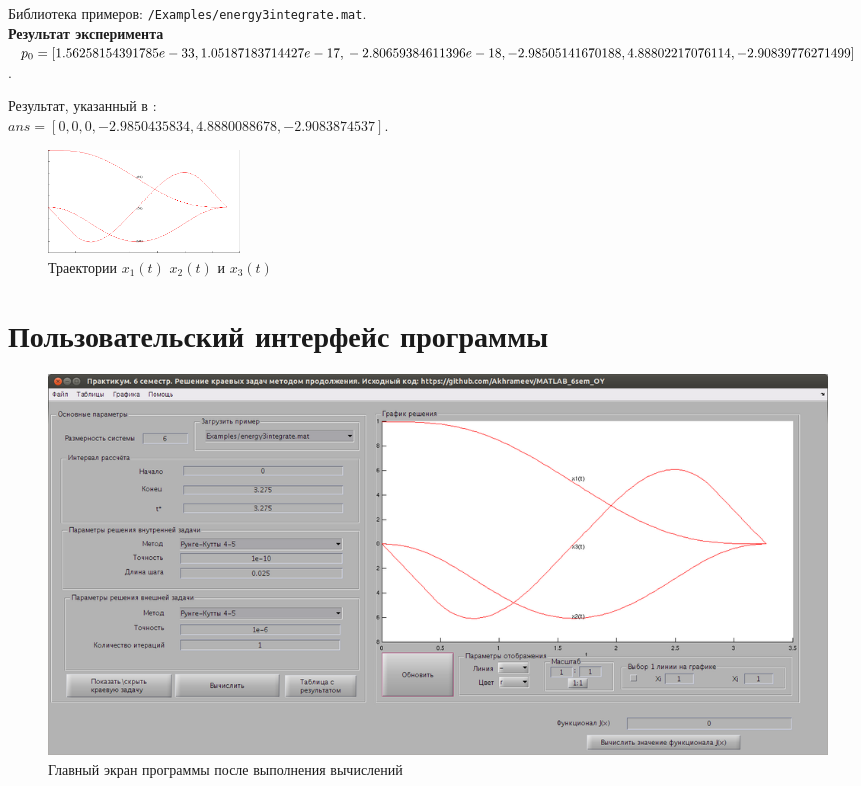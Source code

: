 Библиотека примеров: \texttt{/Examples/energy3integrate.mat}.
\newline\\
{\bf Результат эксперимента}
\newline\\
$p_0=[1.56258154391785e-33,    1.05187183714427e-17,\\	-2.80659384611396e-18,	-2.98505141670188,	4.88802217076114,	-2.90839776271499]$.

Результат, указанный в \cite{oy}:\\
$ans=[0, 0, 0, -2.9850435834, 4.8880088678, -2.9083874537]$.

\begin{figure}[t] 
\begin{center}
\includegraphics[width=2in]{Example3.png}
\end{center}
\caption{Траектории $x_1(t)$ $x_2(t)$ и $x_3(t)$}
\label{Example3_pic}
\end{figure}

\section{Пользовательский интерфейс программы}

\begin{figure}[h!] 
\begin{center}
\includegraphics[scale=0.2]{mainWindow.jpeg}
\end{center}
\caption{Главный экран программы после выполнения вычислений}
\label{mainWindow_pic}
\end{figure}

